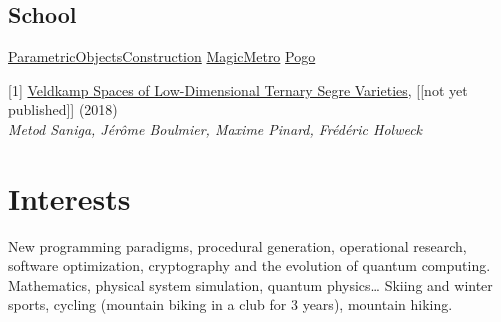 \documentclass[letterpaper,10pt,sans]{moderncv}
\begin{document}
		\subsection{School}
				{\href{https://github.com/pinam45/UTBM\_IN55\_ParametricObjectsConstruction}{ParametricObjectsConstruction}}
				{\href{https://github.com/TiWinDeTea/MagicMetro}{MagicMetro}}
				{\href{https://github.com/pinam45/UTBM_IA41_Pogo}{Pogo}}


	\vspace*{\deletedSpace}
	\begin{thebibliography}{}
		[1] \href{https://arxiv.org/abs/1806.08965}{Veldkamp Spaces of Low-Dimensional Ternary Segre Varieties}, [[not yet published]] (2018)\\
		\textit{Metod Saniga, Jérôme Boulmier, Maxime Pinard, Frédéric Holweck}
	\end{thebibliography}


	\vspace*{\deletedSpace}
	\section{Interests}
			{New programming paradigms, procedural generation, operational research, software optimization, cryptography and the evolution of quantum computing.}
			{Mathematics, physical system simulation, quantum physics\ldots}
			{Skiing and winter sports, cycling (mountain biking in a club for 3 years), mountain hiking.}
\end{document}
